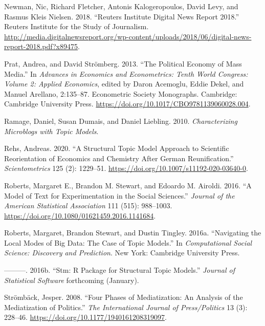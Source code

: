 \documentclass[
  12pt,
]{article}
\newlength{\cslhangindent}
\newlength{\cslentryspacingunit} %
\newenvironment{CSLReferences}[2] %
 {%
  \setlength{\parindent}{0pt}
  \ifodd #1
  \let\oldpar\par
  \def\par{\hangindent=\cslhangindent\oldpar}
  \fi
  \setlength{\parskip}{#2\cslentryspacingunit}
 }%
 {}
\begin{document}
\begin{CSLReferences}{1}{0}
\leavevmode{}%
Newman, Nic, Richard Fletcher, Antonis Kalogeropoulos, David Levy, and
Rasmus Kleis Nielsen. 2018. {``Reuters Institute Digital News Report
2018.''} Reuters Institute for the Study of Journalism.
\url{http://media.digitalnewsreport.org/wp-content/uploads/2018/06/digital-news-report-2018.pdf?x89475}.

\leavevmode{}%
Prat, Andrea, and David Strömberg. 2013. {``The Political Economy of
Mass Media.''} In \emph{Advances in Economics and Econometrics: Tenth
World Congress: Volume 2: Applied Economics}, edited by Daron Acemoglu,
Eddie Dekel, and Manuel Arellano, 2:135--87. Econometric Society
Monographs. Cambridge: Cambridge University Press.
\url{https://doi.org/10.1017/CBO9781139060028.004}.

\leavevmode{}%
Ramage, Daniel, Susan Dumais, and Daniel Liebling. 2010.
\emph{Characterizing Microblogs with Topic Models}.

\leavevmode{}%
Rehs, Andreas. 2020. {``A Structural Topic Model Approach to Scientific
Reorientation of Economics and Chemistry After German Reunification.''}
\emph{Scientometrics} 125 (2): 1229--51.
\url{https://doi.org/10.1007/s11192-020-03640-0}.

\leavevmode{}%
Roberts, Margaret E., Brandon M. Stewart, and Edoardo M. Airoldi. 2016.
{``A Model of Text for Experimentation in the Social Sciences.''}
\emph{Journal of the American Statistical Association} 111 (515):
988--1003. \url{https://doi.org/10.1080/01621459.2016.1141684}.

\leavevmode{}%
Roberts, Margaret, Brandon Stewart, and Dustin Tingley. 2016a.
{``Navigating the Local Modes of Big Data: The Case of Topic Models.''}
In \emph{Computational Social Science: Discovery and Prediction}. New
York: Cambridge University Press.

\leavevmode{}%
---------. 2016b. {``Stm: R Package for Structural Topic Models.''}
\emph{Journal of Statistical Software} forthcoming (January).

\leavevmode{}%
Strömbäck, Jesper. 2008. {``Four Phases of Mediatization: An Analysis of
the Mediatization of Politics.''} \emph{The International Journal of
Press/Politics} 13 (3): 228--46.
\url{https://doi.org/10.1177/1940161208319097}.


\end{CSLReferences}
\end{document}
